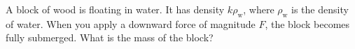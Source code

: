 A block of wood is floating in water. It has density $k\rho_\text{w}$,
where $\rho_\text{w}$ is the density of water.
When you apply a downward force of magnitude $F$, the
block becomes fully submerged. What is the mass of the
block? \answercheck
